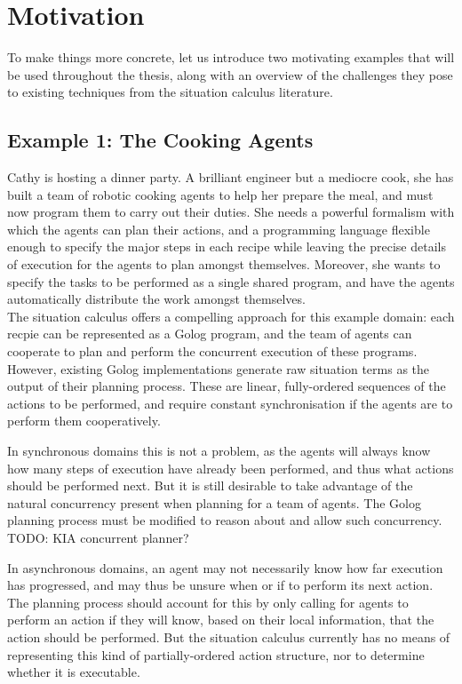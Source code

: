 \section{Motivation}

To make things more concrete, let us introduce two motivating examples
that will be used throughout the thesis, along with an overview of
the challenges they pose to existing techniques from the situation
calculus literature.


\subsection*{Example 1: The Cooking Agents}

Cathy is hosting a dinner party. A brilliant engineer but a mediocre
cook, she has built a team of robotic cooking agents to help her prepare
the meal, and must now program them to carry out their duties. She
needs a powerful formalism with which the agents can plan their actions,
and a programming language flexible enough to specify the major steps
in each recipe while leaving the precise details of execution for
the agents to plan amongst themselves. Moreover, she wants to specify
the tasks to be performed as a single shared program, and have the
agents automatically distribute the work amongst themselves.\\


The situation calculus offers a compelling approach for this example
domain: each recpie can be represented as a Golog program, and the
team of agents can cooperate to plan and perform the concurrent execution
of these programs. However, existing Golog implementations generate
raw situation terms as the output of their planning process. These
are linear, fully-ordered sequences of the actions to be performed,
and require constant synchronisation if the agents are to perform
them cooperatively.

In synchronous domains this is not a problem, as the agents will always
know how many steps of execution have already been performed, and
thus what actions should be performed next. But it is still desirable
to take advantage of the natural concurrency present when planning
for a team of agents. The Golog planning process must be modified
to reason about and allow such concurrency. TODO: KIA concurrent planner?

In asynchronous domains, an agent may not necessarily know how far
execution has progressed, and may thus be unsure when or if to perform
its next action. The planning process should account for this by only
calling for agents to perform an action if they will know, based on
their local information, that the action should be performed. But
the situation calculus currently has no means of representing this
kind of partially-ordered action structure, nor to determine whether
it is executable.

